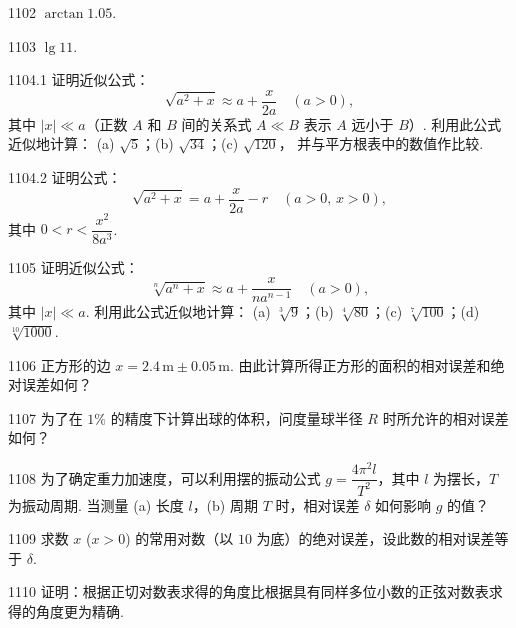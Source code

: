 \begin{prob}[S]{1102}
$\arctan 1.05$.
\end{prob}

\begin{prob}[S]{1103}
$\lg 11$.
\end{prob}

\begin{prob}[L]{1104.1}
证明近似公式：
\[
\sqrt{a^2 + x} \approx a + \frac{x}{2a} \quad (a > 0),
\]
其中 $|x| \ll a$（正数 $A$ 和 $B$ 间的关系式 $A \ll B$ 表示 $A$ 远小于 $B$）. 利用此公式近似地计算：
(a) $\sqrt{5}$；\qquad (b) $\sqrt{34}$；\qquad (c) $\sqrt{120}$，
并与平方根表中的数值作比较.
\end{prob}

\begin{prob}[M]{1104.2}
证明公式：
\[
\sqrt{a^2 + x} = a + \frac{x}{2a} - r \quad (a > 0, \, x > 0),
\]
其中 $0 < r < \dfrac{x^2}{8a^3}$.
\end{prob}

\begin{prob}[L]{1105}
证明近似公式：
\[
\sqrt[n]{a^n + x} \approx a + \frac{x}{na^{n-1}} \quad (a > 0),
\]
其中 $|x| \ll a$. 利用此公式近似地计算：
(a) $\sqrt[3]{9}$；\qquad (b) $\sqrt[4]{80}$；\qquad (c) $\sqrt[7]{100}$；\qquad (d) $\sqrt[10]{1000}$.
\end{prob}

\begin{prob}[M]{1106}
正方形的边 $x = 2.4\,\mathrm{m} \pm 0.05\,\mathrm{m}$. 由此计算所得正方形的面积的相对误差和绝对误差如何？
\end{prob}

\begin{prob}[M]{1107}
为了在 $1\%$ 的精度下计算出球的体积，问度量球半径 $R$ 时所允许的相对误差如何？
\end{prob}

\begin{prob}[M]{1108}
为了确定重力加速度，可以利用摆的振动公式 $g = \dfrac{4\pi^2 l}{T^2}$，其中 $l$ 为摆长，$T$ 为振动周期. 当测量 (a) 长度 $l$，(b) 周期 $T$ 时，相对误差 $\delta$ 如何影响 $g$ 的值？
\end{prob}

\begin{prob}[M]{1109}
求数 $x$ ($x > 0$) 的常用对数（以 $10$ 为底）的绝对误差，设此数的相对误差等于 $\delta$.
\end{prob}

\begin{prob}[M]{1110}
证明：根据正切对数表求得的角度比根据具有同样多位小数的正弦对数表求得的角度更为精确.
\end{prob}

